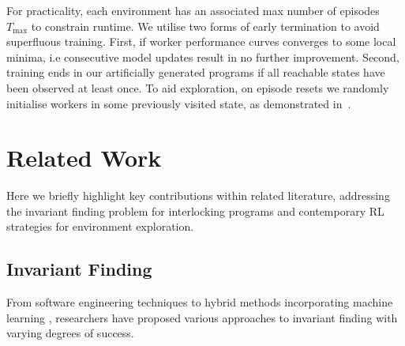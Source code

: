 \documentclass[conference,compsoc]{IEEEtran}
\begin{document}
For practicality, each environment has an associated max number of episodes $T_{\max}$ to constrain runtime. We utilise two forms of early termination to avoid superfluous training. First, if worker performance curves converges to some local minima, i.e consecutive model updates result in no further improvement. Second, training ends in our artificially generated programs if all reachable states have been observed at least once. To aid exploration, on episode resets we randomly initialise workers in some previously visited state, as demonstrated in~\cite{gordillo2021improving}. 

\section{Related Work}
Here we briefly highlight key contributions within related literature, addressing the invariant finding problem for interlocking programs and contemporary RL strategies for environment exploration.


\subsection{Invariant Finding}
From software engineering techniques \cite{case2007automated, bensalem1996powerful} to hybrid methods incorporating machine learning \cite{garg2016learning}, researchers have proposed various approaches to invariant finding with varying degrees of success.
\end{document}
